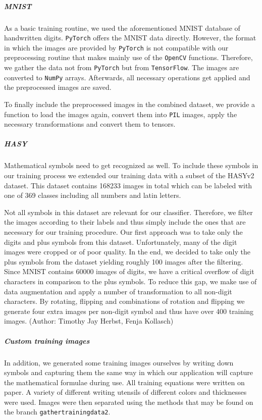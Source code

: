 \documentclass[11pt]{article}
\begin{document}
		\subparagraph{MNIST}
			As a basic training routine, we used the aforementioned MNIST database of handwritten digits. \texttt{PyTorch} offers the MNIST data directly. However, the format in which the images are provided by \texttt{PyTorch} is not compatible with our preprocessing routine that makes mainly use of the \texttt{OpenCV} functions. Therefore, we gather the data not from \texttt{PyTorch} but from \texttt{TensorFlow}. The images are converted to \texttt{NumPy} arrays. Afterwards, all necessary operations get applied and the preprocessed images are saved. 
			
			To finally include the preprocessed images in the combined dataset, we provide a function to load the images again, convert them into \texttt{PIL} images, apply the necessary transformations and convert them to tensors.
			
		\subparagraph{HASY}
			Mathematical symbols need to get recognized as well. To include these symbols in our training process we extended our training data with a subset of the HASYv2\cite{hasy} dataset. This dataset contains 168233 images in total which can be labeled with one of 369 classes including all numbers and latin letters. 
			
			Not all symbols in this dataset are relevant for our classifier. Therefore, we filter the images according to their labels and thus simply include the ones that are necessary for our training procedure. Our first approach was to take only the digits and plus symbols from this dataset. Unfortunately, many of the digit images were cropped or of poor quality. In the end, we decided to take only the plus symbols from the dataset yielding roughly 100 images after the filtering. Since MNIST contains 60000 images of digits, we have a critical overflow of digit characters in comparison to the plus symbols. To reduce this gap, we make use of data augmentation and apply a number of transformation to all non-digit characters. By rotating, flipping and combinations of rotation and flipping we generate four extra images per non-digit symbol and thus have over 400 training images.
			\newline			\newline
			\indent\small{(Author: Timothy Jay Herbst, Fenja Kollasch)}
			\vspace{-0.5 cm}
		\subparagraph{Custom training images}	
		In addition, we generated some training images ourselves by writing down symbols and capturing them the same way in which our application will capture the mathematical formulae during use.
		All training equations were written on paper.
		A variety of different writing utensils of different colors and thicknesses were used.
		Images were then separated using the methods that may be found on the branch \texttt{gathertrainingdata2}. %
		
\end{document}
